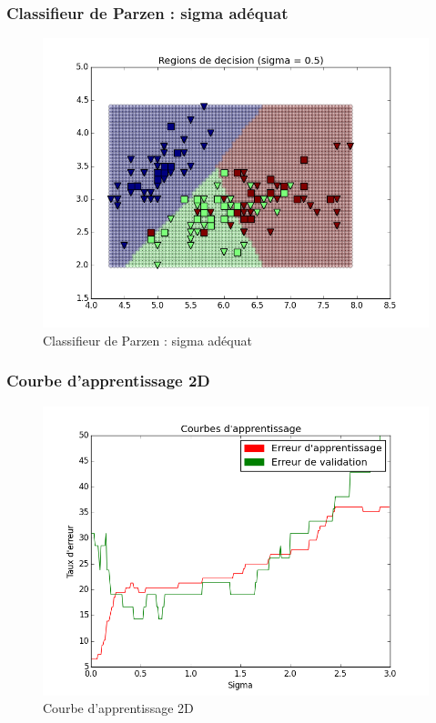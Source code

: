 \documentclass[a4paper,10pt]{article}
\begin{document}
\subsubsection{Classifieur de Parzen : sigma adéquat}
\begin{figure}[H]
	\includegraphics[width=12cm]{images/bayes_parzen_bon.png} 
	\centering
	\caption{Classifieur de Parzen : sigma adéquat}
	\label{fig:comp}
\end{figure}

\subsubsection{Courbe d'apprentissage 2D}
\begin{figure}[H]
	\includegraphics[width=12cm]{images/bayes_parzen_courbe_apprentissage_2d.png} 
	\centering
	\caption{Courbe d'apprentissage 2D}
	\label{fig:comp}
\end{figure}
\end{document}
